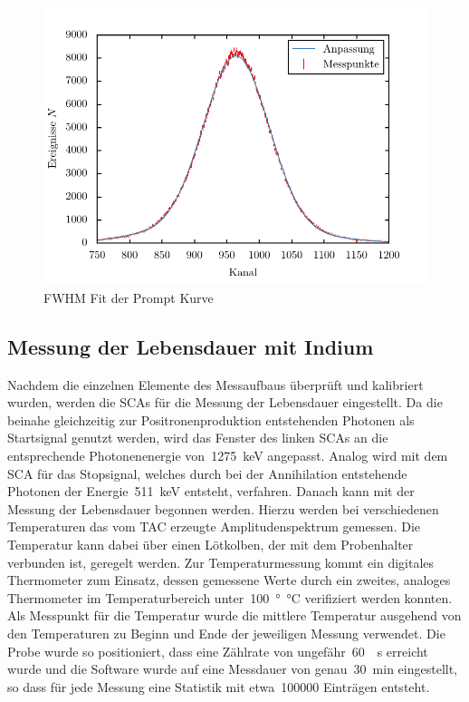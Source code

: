 \documentclass[11pt, a4paper]{article}
\numberwithin{equation}{section}
\begin{document}
\begin{figure}[h]
	\centering
	\includegraphics{./figures/fwhm_fit.pdf}
	\caption{FWHM Fit der Prompt Kurve}
\end{figure}




\subsection{Messung der Lebensdauer mit Indium}

Nachdem die einzelnen Elemente des Messaufbaus überprüft und kalibriert wurden, werden die SCAs für die Messung der Lebensdauer eingestellt.
Da die beinahe gleichzeitig zur Positronenproduktion entstehenden Photonen als Startsignal genutzt werden, wird das Fenster des linken SCAs an die entsprechende Photonenenergie von~\SI{1275}{keV} angepasst.
Analog wird mit dem SCA für das Stopsignal, welches durch bei der Annihilation entstehende Photonen der Energie~\SI{511}{keV} entsteht, verfahren.
Danach kann mit der Messung der Lebensdauer begonnen werden.
Hierzu werden bei verschiedenen Temperaturen das vom TAC erzeugte Amplitudenspektrum gemessen.
Die Temperatur kann dabei über einen Lötkolben, der mit dem Probenhalter verbunden ist, geregelt werden.
Zur Temperaturmessung kommt ein digitales Thermometer zum Einsatz, dessen gemessene Werte durch ein zweites, analoges Thermometer im Temperaturbereich unter~\SI{100}{\degree\celsius} verifiziert werden konnten.
Als Messpunkt für die Temperatur wurde die mittlere Temperatur ausgehend von den Temperaturen zu Beginn und Ende der jeweiligen Messung verwendet.
Die Probe wurde so positioniert, dass eine Zählrate von ungefähr~\SI{60}{\per\second} erreicht wurde und die Software wurde auf eine Messdauer von genau~\SI{30}{min} eingestellt, so dass für jede Messung eine Statistik mit etwa~\num{100000} Einträgen entsteht.
\end{document}
